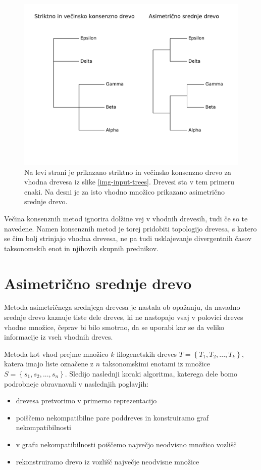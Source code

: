 \documentclass[a4paper, 12pt]{book}
\begin{document}
\begin{figure}[h!]
	\begin{center}
		\includegraphics[scale=0.65, clip=true, trim=0 3cm 0 9mm]{gfx/strict_majority_amt_ex.pdf}
	\end{center}
	\caption{Na levi strani je prikazano striktno in večinsko konsenzno drevo za vhodna drevesa iz slike \ref{img-input-trees}. Drevesi sta v tem primeru enaki. Na desni je za isto vhodno množico prikazano asimetrično srednje drevo.}
	\label{img-strict-majority-amt-example}
\end{figure}

Večina konsenznih metod ignorira dolžine vej v vhodnih drevesih, tudi če so te navedene. Namen konsenznih metod je torej pridobiti topologijo drevesa, s katero se čim bolj strinjajo vhodna drevesa, ne pa tudi usklajevanje divergentnih časov taksonomskih enot in njihovih skupnih prednikov.  

\chapter{Asimetrično srednje drevo}
Metoda asimetričnega srednjega drevesa je nastala ob opažanju, da navadno srednje drevo kaznuje tiste dele dreves, ki ne nastopajo vsaj v polovici dreves vhodne množice, čeprav bi bilo smotrno, da se uporabi kar se da veliko informacije iz vseh vhodnih dreves\cite{pw}.

Metoda kot vhod prejme množico $k$ filogenetskih dreves $T = \left\{ {T_1, T_2, ..., T_k} \right\}$, katera imajo liste označene z $n$ taksonomskimi enotami iz množice $S = \left\{ {s_1, s_2, ..., s_n} \right\}$. Sledijo naslednji koraki algoritma, katerega dele bomo podrobneje obravnavali v naslednjih poglavjih:
\begin{itemize}
	\item drevesa pretvorimo v primerno reprezentacijo
	\item poiščemo nekompatibilne pare poddreves in konstruiramo graf nekompatibilnosti
	\item v grafu nekompatibilnosti poiščemo največjo neodvisno množico vozlišč
	\item rekonstruiramo drevo iz vozlišč največje neodvisne množice
\end{itemize}
\end{document}
